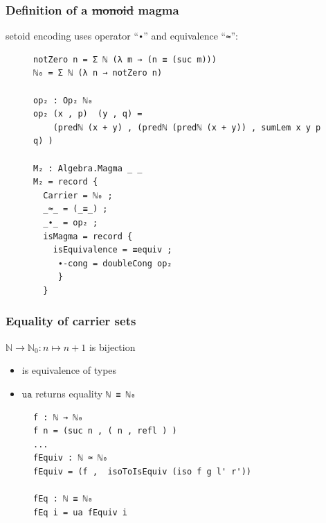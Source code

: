 \documentclass[english,draft]{beamer}
\begin{document}
\begin{frame}[fragile]
\frametitle{Definition of a \st{monoid} magma}

setoid encoding uses operator ``\texttt{∙}'' and equivalence ``\texttt{≈}'':

\begin{figure}
\footnotesize
\begin{BVerbatim}
notZero n = Σ ℕ (λ m → (n ≡ (suc m)))
ℕ₀ = Σ ℕ (λ n → notZero n) 

op₂ : Op₂ ℕ₀
op₂ (x , p)  (y , q) = 
    (predℕ (x + y) , (predℕ (predℕ (x + y)) , sumLem x y p q) )

M₂ : Algebra.Magma _ _
M₂ = record { 
  Carrier = ℕ₀ ;
  _≈_ = (_≡_) ;
  _∙_ = op₂ ;
  isMagma = record {
    isEquivalence = ≡equiv ;
     ∙-cong = doubleCong op₂
     }
  }
\end{BVerbatim}
\end{figure}
 
\end{frame}

\begin{frame}[fragile]
\frametitle{Equality of carrier sets}

 $\mathbb{N} \rightarrow \mathbb{N}_0: n\mapsto n + 1 $ is bijection
 
 \begin{itemize}
  \item is equivalence of types
  \item $\texttt{ua}$ returns equality \texttt{ℕ ≡ ℕ₀}
 \end{itemize}
 
 
 \begin{figure}
 \begin{BVerbatim}
f : ℕ → ℕ₀ 
f n = (suc n , ( n , refl ) )
...
fEquiv : ℕ ≃ ℕ₀ 
fEquiv = (f ,  isoToIsEquiv (iso f g l' r'))

fEq : ℕ ≡ ℕ₀ 
fEq i = ua fEquiv i
 \end{BVerbatim}
\end{figure}

\end{frame}
\end{document}
